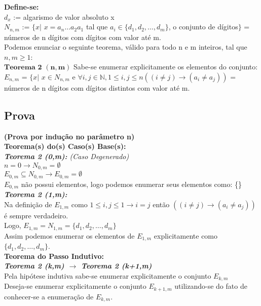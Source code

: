 \documentclass[twoside]{article}
\begin{document}
\begin{multicols}{2}
\textbf{Define-se:}\\
$d_x$ := algarismo de valor absoluto x\\
$N_{n,m}$ := $\{ x | $ $x=a_n \dots a_2a_1$ tal que $a_i \in \{d_1,d_2, \dots ,d_m\}$, o conjunto de dígitos$\}$ = números de n dígitos com dígitos com valor até m.\\

Podemos enunciar o seguinte teorema, válido para todo n e m inteiros, tal que $n,m\geq1$:\\

$\mathbf{Teorema}$ $\mathbf{2}$ $\mathbf{(n,m)}$ Sabe-se enumerar explicitamente os elementos do conjunto:\\
$E_{n,m}$ = $\{ x | $ $x \in N_{n,m}$ e $\forall i,j \in \mathbb{N}, 1 \leq i,j \leq n ((i \neq j) \rightarrow ( a_i \neq a_j ))$ = números de n dígitos com dígitos distintos com valor até m.

\subsection{ Prova }
\indent \textbf{(Prova por indução no parâmetro n)}\\

\textbf{Teorema(s) do(s) Caso(s) Base(s):}\\

\textit{\textbf{Teorema 2 (0,m):} (Caso Degenerado)}\\
$n=0 \rightarrow N_{0,m} = \emptyset$\\
$E_{0,m} \subseteq N_{0,m} \rightarrow E_{0,m} = \emptyset $\\
$E_{0,m}$ não possui elementos, logo podemos enumerar seus elementos como: \{\}\\

\textit{\textbf{Teorema 2 (1,m):}}\\
Na definição de $E_{1,m}$ como $1 \leq i,j \leq 1 \rightarrow i=j$ então $((i \neq j) \rightarrow ( a_i \neq a_j ))$ é sempre verdadeiro.\\
Logo,  $E_{1,m} = N_{1,m} = \{d_1,d_2,\dots,d_m\}$\\
Assim podemos enumerar os elementos de  $E_{1,m}$ explicitamente como $\{d_1,d_2,\dots,d_m\}$.\\

\textbf{Teorema do Passo Indutivo:}\\

\textit{\textbf{Teorema 2 (k,m) $\rightarrow$ Teorema 2 (k+1,m)}}\\
Pela hipótese indutiva sabe-se enumerar explicitamente o conjunto $E_{k,m}$ \\
Deseja-se enumerar explicitamente o conjunto  $E_{k+1,m}$ utilizando-se do fato de conhecer-se a enumeração de  $E_{k,m}$.\\


\end{multicols}
\end{document}
